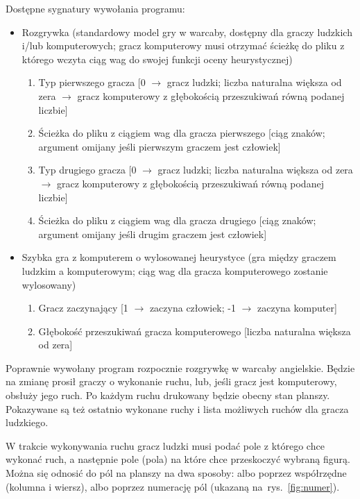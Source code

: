 Dostępne sygnatury wywołania programu:
\begin{itemize}
    \item Rozgrywka (standardowy model gry w warcaby, dostępny dla graczy ludzkich i/lub komputerowych; gracz komputerowy musi otrzymać ścieżkę do pliku z którego wczyta ciąg wag do swojej funkcji oceny heurystycznej)
    \begin{enumerate}
        \item Typ pierwszego gracza [0 $\rightarrow$ gracz ludzki; liczba naturalna większa od zera $\rightarrow$ gracz komputerowy z głębokością przeszukiwań równą podanej liczbie]
        \item Ścieżka do pliku z ciągiem wag dla gracza pierwszego [ciąg znaków; argument omijany jeśli pierwszym graczem jest człowiek]
        \item Typ drugiego gracza [0 $\rightarrow$ gracz ludzki; liczba naturalna większa od zera $\rightarrow$ gracz komputerowy z głębokością przeszukiwań równą podanej liczbie]
        \item Ścieżka do pliku z ciągiem wag dla gracza drugiego [ciąg znaków; argument omijany jeśli drugim graczem jest człowiek]
    \end{enumerate}
    \item Szybka gra z komputerem o wylosowanej heurystyce (gra między graczem ludzkim a komputerowym; ciąg wag dla gracza komputerowego zostanie wylosowany)
    \begin{enumerate}
        \item Gracz zaczynający [1 $\rightarrow$ zaczyna człowiek; -1 $\rightarrow$ zaczyna komputer]
        \item Głębokość przeszukiwań gracza komputerowego [liczba naturalna większa od zera]
    \end{enumerate}
\end{itemize}

Poprawnie wywołany program rozpocznie rozgrywkę w warcaby angielskie. Będzie na zmianę prosił graczy o wykonanie ruchu, lub, jeśli gracz jest komputerowy, obsłuży jego ruch. Po każdym ruchu drukowany będzie obecny stan planszy. Pokazywane są też ostatnio wykonane ruchy i lista możliwych ruchów dla gracza ludzkiego.

W trakcie wykonywania ruchu gracz ludzki musi podać pole z którego chce wykonać ruch, a następnie pole (pola) na które chce przeskoczyć wybraną figurą. Można się odnosić do pól na planszy na dwa sposoby: albo poprzez współrzędne (kolumna i wiersz), albo poprzez numerację pól (ukazaną na~rys.~\ref{fig:numer}).

